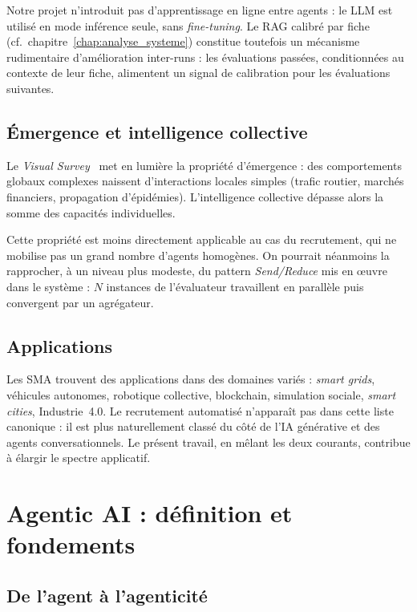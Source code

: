 Notre projet n'introduit pas d'apprentissage en ligne entre agents : le LLM est utilisé en mode inférence seule, sans \emph{fine-tuning}. Le RAG calibré par fiche (cf.\ chapitre~\ref{chap:analyse_systeme}) constitue toutefois un mécanisme rudimentaire d'amélioration inter-runs : les évaluations passées, conditionnées au contexte de leur fiche, alimentent un signal de calibration pour les évaluations suivantes.

\subsection{Émergence et intelligence collective}

Le \emph{Visual Survey}~\cite{sma_visual_survey} met en lumière la propriété d'émergence : des comportements globaux complexes naissent d'interactions locales simples (trafic routier, marchés financiers, propagation d'épidémies). L'intelligence collective dépasse alors la somme des capacités individuelles.

Cette propriété est moins directement applicable au cas du recrutement, qui ne mobilise pas un grand nombre d'agents homogènes. On pourrait néanmoins la rapprocher, à un niveau plus modeste, du pattern \emph{Send/Reduce} mis en œuvre dans le système : $N$ instances de l'évaluateur travaillent en parallèle puis convergent par un agrégateur.

\subsection{Applications}

Les SMA trouvent des applications dans des domaines variés \cite{sma_wjarr} : \emph{smart grids}, véhicules autonomes, robotique collective, blockchain, simulation sociale, \emph{smart cities}, Industrie~4.0. Le recrutement automatisé n'apparaît pas dans cette liste canonique : il est plus naturellement classé du côté de l'IA générative et des agents conversationnels. Le présent travail, en mêlant les deux courants, contribue à élargir le spectre applicatif.

\section{Agentic AI : définition et fondements}
\label{sec:agentic}

\subsection{De l'agent à l'agenticité}

